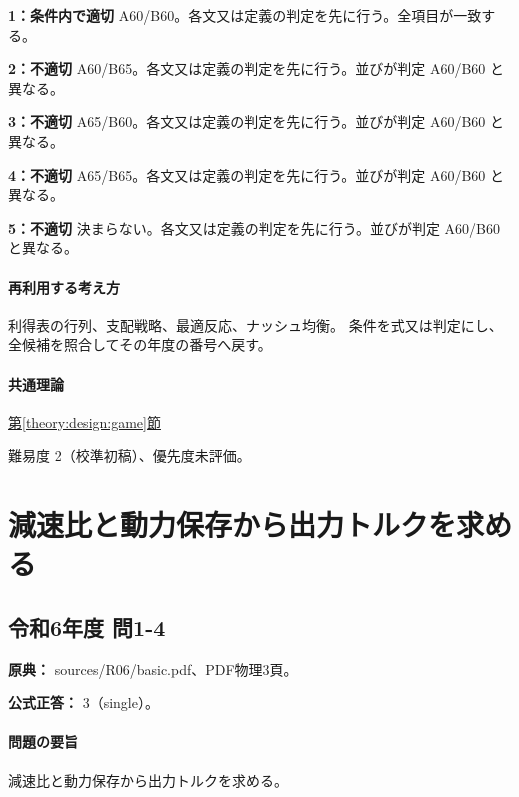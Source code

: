\noindent\textbf{1：条件内で適切} A60/B60。各文又は定義の判定を先に行う。全項目が一致する。\par

\noindent\textbf{2：不適切} A60/B65。各文又は定義の判定を先に行う。並びが判定 A60/B60 と異なる。\par

\noindent\textbf{3：不適切} A65/B60。各文又は定義の判定を先に行う。並びが判定 A60/B60 と異なる。\par

\noindent\textbf{4：不適切} A65/B65。各文又は定義の判定を先に行う。並びが判定 A60/B60 と異なる。\par

\noindent\textbf{5：不適切} 決まらない。各文又は定義の判定を先に行う。並びが判定 A60/B60 と異なる。\par

\paragraph{再利用する考え方} 利得表の行列、支配戦略、最適反応、ナッシュ均衡。 条件を式又は判定にし、全候補を照合してその年度の番号へ戻す。

\paragraph{共通理論} \hyperref[theory:design:game]{第\ref*{theory:design:game}節}

\par 難易度 2（校準初稿）、優先度未評価。

\section{減速比と動力保存から出力トルクを求める}

\subsection{令和6年度 問1-4}
\label{q:r06-reg-basic-1-4}

\noindent\textbf{原典：} sources/R06/basic.pdf、PDF物理3頁。

\textbf{公式正答：} 3（single）。

\paragraph{問題の要旨} 減速比と動力保存から出力トルクを求める。

